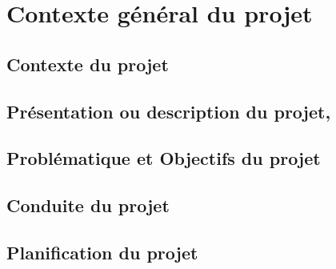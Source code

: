 

\chapter{Contexte général du projet}%
\label{chap:chapter_one}

\section{Contexte du projet}
\section{Présentation ou description du projet,}
\section{Problématique et Objectifs du projet}
\section{Conduite du projet}
\section{Planification du projet}
